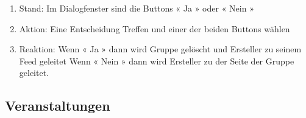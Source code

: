 \documentclass[parskip=full]{scrartcl}
\begin{document}
\begin{itemize}
\begin{enumerate}
			\begin{enumerate}[nosep]
				\item Stand: Im Dialogfenster sind die \gls{Button}s « Ja » oder « Nein »
				\item Aktion: Eine Entscheidung Treffen und einer der beiden \gls{Button}s wählen
				\item Reaktion: Wenn « Ja » dann wird Gruppe gelöscht und Ersteller zu seinem \gls{Feed} geleitet
				Wenn  «  Nein » dann wird Ersteller zu der Seite der Gruppe geleitet.
				
			\end{enumerate}
			
		\end{enumerate}		
		
	\end{itemize}
	
	
	\subsection{Veranstaltungen}
	
\end{document}
